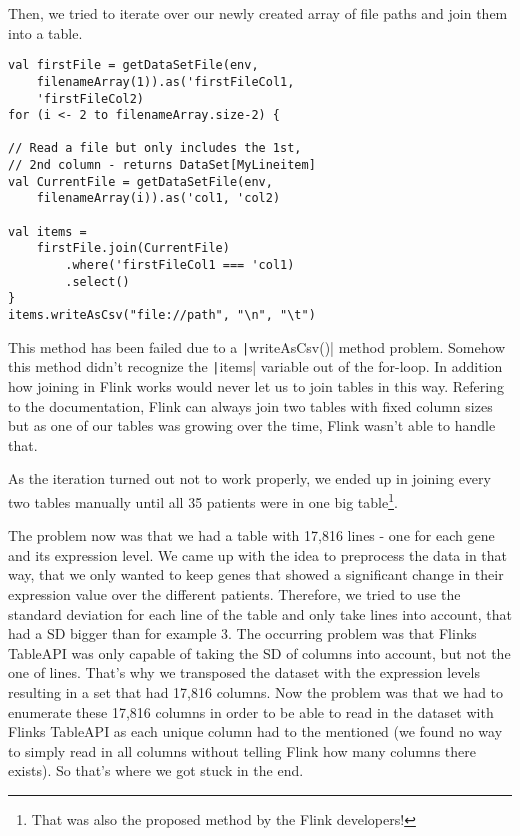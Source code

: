 \documentclass{bioinfo}
\begin{document}
\begin{methods}
Then, we tried to iterate over our newly created array of file paths and join them into a table.

\begin{verbatim}
val firstFile = getDataSetFile(env,
	filenameArray(1)).as('firstFileCol1,
	'firstFileCol2)
for (i <- 2 to filenameArray.size-2) {

// Read a file but only includes the 1st,
// 2nd column - returns DataSet[MyLineitem]
val CurrentFile = getDataSetFile(env,
	filenameArray(i)).as('col1, 'col2)

val items =
	firstFile.join(CurrentFile)
		.where('firstFileCol1 === 'col1)
		.select()
}
items.writeAsCsv("file://path", "\n", "\t")
\end{verbatim}

This method has been failed due to a \texttt|writeAsCsv()| method problem. Somehow this method didn't recognize the \texttt|items| variable out of the for-loop. In addition how joining in Flink works would never let us to join tables in this way. Refering to the documentation, Flink can always join two tables with fixed column sizes but as one of our tables was growing over the time, Flink wasn't able to handle that.

As the iteration turned out not to work properly, we ended up in joining every two tables manually until all 35 patients were in one big table\footnote{That was also the proposed method by the Flink developers!}.


The problem now was that we had a table with 17,816 lines - one for each gene and its expression level. We came up with the idea to preprocess the data in that way, that we only wanted to keep genes that showed a significant change in their expression value over the different patients. Therefore, we tried to use the standard deviation for each line of the table and only take lines into account, that had a SD bigger than for example 3. The occurring problem was that Flinks TableAPI was only capable of taking the SD of columns into account, but not the one of lines. That’s why we transposed the dataset with the expression levels resulting in a set that had 17,816 columns. Now the problem was that we had to enumerate these 17,816 columns in order to be able to read in the dataset with Flinks TableAPI as each unique column had to the mentioned (we found no way to simply read in all columns without telling Flink how many columns there exists). So that's where we got stuck in the end.



\end{methods}
\end{document}
